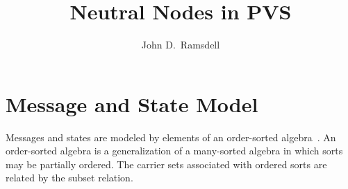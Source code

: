 \documentclass[12pt]{article}
\title{Neutral Nodes in PVS}
\author{John D.~Ramsdell}
\newcommand{\seq}[1]{\ensuremath{\langle#1\rangle}}
\begin{document}
\maketitle


\section{Message and State Model}
\label{sec:tpm}

Messages and states are modeled by elements of an order-sorted
algebra~\cite{GoguenMeseguer92}. An order-sorted algebra is a
generalization of a many-sorted algebra in which sorts may be
partially ordered.  The carrier sets associated with ordered sorts are
related by the subset relation.
\end{document}
